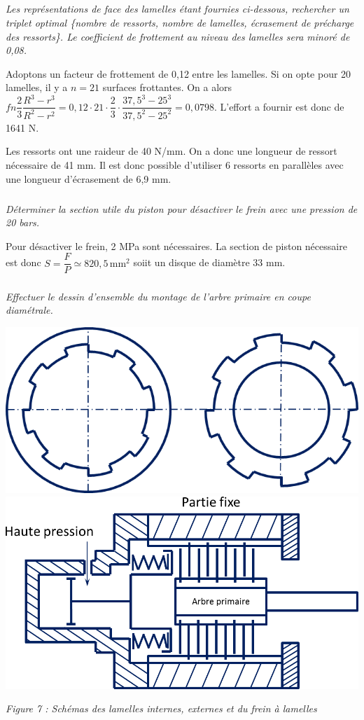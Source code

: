 \documentclass[10pt,fleqn]{article} %
\begin{document}
\subparagraph{}
\textit{Les représentations de face des lamelles étant fournies ci-dessous, rechercher un triplet optimal \{nombre de ressorts, nombre de lamelles, écrasement de précharge des ressorts\}. Le coefficient de frottement au niveau des lamelles sera minoré de 0,08.}

\ifprof
\begin{corrige}
Adoptons un facteur de frottement de 0,12 entre les lamelles. Si on opte pour 20 lamelles, il y a $n=21$ surfaces frottantes. On a alors $fn\dfrac{2}{3} \dfrac{R^3-r^3}{R^2-r^2} = 0,12\cdot 21 \cdot \dfrac{2}{3} \cdot\dfrac{37,5^3-25^3}{37,5^2-25^2}=0,0798$. L'effort a fournir est donc de 1641 N.

Les ressorts ont une raideur de 40 N/mm. On a donc une longueur de ressort nécessaire de 41 mm. Il est donc possible d'utiliser 6 ressorts en parallèles avec une longueur d'écrasement  de 6,9 mm.
 
\end{corrige}
\else
\fi

\subparagraph{}
\textit{Déterminer la section utile du piston pour désactiver le frein avec une pression de 20 bars.}

\ifprof
\begin{corrige}
Pour désactiver le frein, 2 MPa sont nécessaires. La section de piston nécessaire est donc $S = \dfrac{F}{P} \simeq 820,5\,  \text{mm}^2 $ soiit un disque de diamètre 33 mm. 
\end{corrige}
\else
\fi

\subparagraph{}
\textit{Effectuer le dessin d'ensemble du montage de l'arbre primaire en coupe diamétrale.}

\ifprof
\begin{corrige}
\end{corrige}
\else
\fi


\begin{center}
\includegraphics[width=.4\textwidth]{images/lamelles}\hfill
\includegraphics[width=.45\textwidth]{images/frein}

\textit{Figure 7 : Schémas des lamelles internes, externes et du frein à lamelles}
\end{center}
\end{document}
